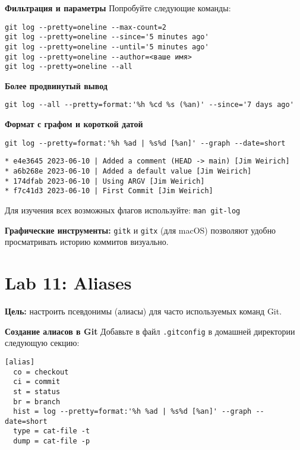 \documentclass[a4paper,12pt]{report}
\begin{document}
\textbf{Фильтрация и параметры}
Попробуйте следующие команды:
\begin{verbatim}
git log --pretty=oneline --max-count=2
git log --pretty=oneline --since='5 minutes ago'
git log --pretty=oneline --until='5 minutes ago'
git log --pretty=oneline --author=<ваше имя>
git log --pretty=oneline --all
\end{verbatim}

\textbf{Более продвинутый вывод}
\begin{verbatim}
git log --all --pretty=format:'%h %cd %s (%an)' --since='7 days ago'
\end{verbatim}

\textbf{Формат с графом и короткой датой}
\begin{verbatim}
git log --pretty=format:'%h %ad | %s%d [%an]' --graph --date=short
\end{verbatim}

\begin{verbatim}
* e4e3645 2023-06-10 | Added a comment (HEAD -> main) [Jim Weirich]
* a6b268e 2023-06-10 | Added a default value [Jim Weirich]
* 174dfab 2023-06-10 | Using ARGV [Jim Weirich]
* f7c41d3 2023-06-10 | First Commit [Jim Weirich]
\end{verbatim}


Для изучения всех возможных флагов используйте: \texttt{man git-log}

\textbf{Графические инструменты:} \texttt{gitk} и \texttt{gitx} (для macOS) позволяют удобно просматривать историю коммитов визуально.

\section{Lab 11: Aliases}
\textbf{Цель:} настроить псевдонимы (алиасы) для часто используемых команд Git.

\textbf{Создание алиасов в Git}
Добавьте в файл \texttt{.gitconfig} в домашней директории следующую секцию:

\begin{verbatim}
[alias]
  co = checkout
  ci = commit
  st = status
  br = branch
  hist = log --pretty=format:'%h %ad | %s%d [%an]' --graph --date=short
  type = cat-file -t
  dump = cat-file -p
\end{verbatim}
\end{document}
